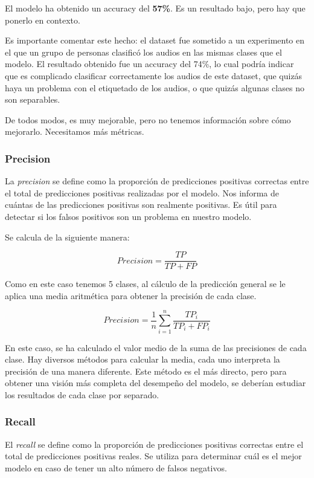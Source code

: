 El modelo ha obtenido un accuracy del \textbf{57\%}.
Es un resultado bajo, pero hay que ponerlo en contexto.

Es importante comentar este hecho: el dataset fue sometido a un experimento en el que un grupo de personas clasificó los audios en las mismas clases que el modelo. \cite{AESDD_webpage}
El resultado obtenido fue un accuracy del 74\%, lo cual podría indicar que es complicado clasificar correctamente los audios de este dataset, que quizás haya un problema con el etiquetado de los audios, o que quizás algunas clases no son separables.

De todos modos, es muy mejorable, pero no tenemos información sobre cómo mejorarlo.
Necesitamos más métricas.

\subsubsection{Precision}\label{seccion:precision}
La \textit{precision} se define como la proporción de predicciones positivas correctas entre el total de predicciones positivas realizadas por el modelo.
Nos informa de cuántas de las predicciones positivas son realmente positivas.
Es útil para detectar si los falsos positivos son un problema en nuestro modelo.

Se calcula de la siguiente manera:

\begin{equation}
    Precision = \frac{TP}{TP + FP}
\end{equation}

Como en este caso tenemos 5 clases, al cálculo de la predicción general se le aplica una media aritmética para obtener la precisión de cada clase.

\begin{equation}
    Precision = \frac{1}{n} \sum_{i=1}^{n} \frac{TP_i}{TP_i + FP_i}
\end{equation}

En este caso, se ha calculado el valor medio de la suma de las precisiones de cada clase.
Hay diversos métodos para calcular la media, cada uno interpreta la precisión de una manera diferente.
Este método es el más directo, pero para obtener una visión más completa del desempeño del modelo, se deberían estudiar los resultados de cada clase por separado.

\subsubsection{Recall}\label{seccion:recall}
El \textit{recall} se define como la proporción de predicciones positivas correctas entre el total de predicciones positivas reales.
Se utiliza para determinar cuál es el mejor modelo en caso de tener un alto número de falsos negativos.

